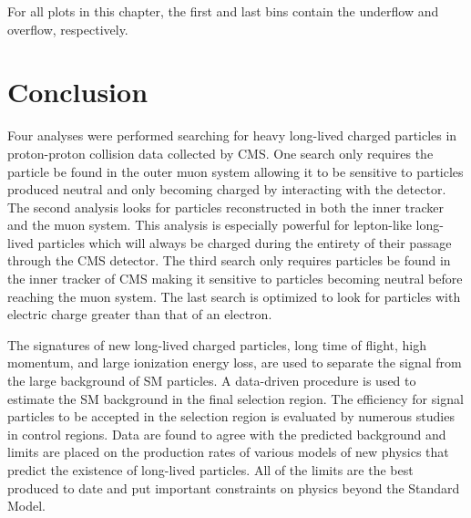 For all plots in this chapter, the first and last bins contain the underflow and overflow, respectively.



















\section{Conclusion}
Four analyses were performed searching for heavy long-lived charged particles in proton-proton collision data collected by CMS. One search only requires the particle be found
in the outer muon system allowing it to be sensitive to particles produced neutral and only becoming charged by interacting with the detector. The second analysis looks
for particles reconstructed in both the inner tracker and the muon system. This analysis is especially powerful for lepton-like long-lived particles which will always be charged
during the entirety of their passage through the CMS detector. The third search only requires particles be found in the inner tracker of CMS making it sensitive
to particles becoming neutral before reaching the muon system. The last search is optimized to look for particles with electric charge greater than that of
an electron.

The signatures of new long-lived charged particles, long time of flight, high momentum, and large ionization
energy loss, are used to separate the signal from the large background of SM particles.
A data-driven procedure is used to estimate the SM background in the final selection region. 
The efficiency for signal particles to be accepted in the selection region is evaluated by numerous studies in control regions.
Data are found to agree with the predicted background and limits are placed on the production rates of various models of new physics that predict
the existence of long-lived particles. All of the limits are the best produced to date and put important constraints on physics beyond the Standard Model.